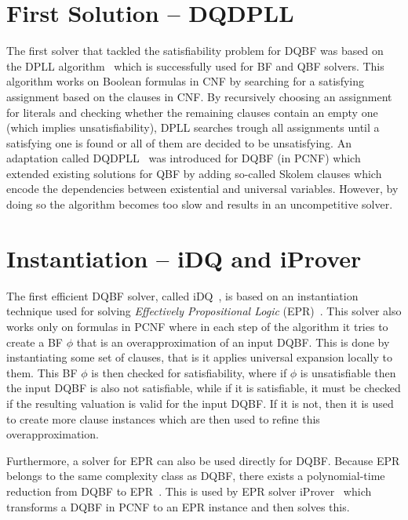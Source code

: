 \documentclass[
  digital, %
  color,
  twoside, %
  table,   %
  nolof,     %
  nolot,     %
]{fithesis3}
\theoremstyle{definition}
\theoremstyle{remark}
\begin{document}
\section{First Solution -- DQDPLL}
The first solver that tackled the satisfiability problem for DQBF was based on the DPLL algorithm~\cite{DPLL} which is successfully used for BF and QBF solvers. This algorithm works on Boolean formulas in CNF by searching for a satisfying assignment based on the clauses in CNF. By recursively choosing an assignment for literals and checking whether the remaining clauses contain an empty one (which implies unsatisfiability), DPLL searches trough all assignments until a satisfying one is found or all of them are decided to be unsatisfying. An adaptation called DQDPLL~\cite{DPLLalgorithm} was introduced for DQBF (in PCNF) which extended existing solutions for QBF by adding so-called Skolem clauses which encode the dependencies between existential and universal variables. However, by doing so the algorithm becomes too slow and results in an uncompetitive solver.

\section{Instantiation -- iDQ and iProver}
The first efficient DQBF solver, called iDQ~\cite{iDQandDQDIMACS}, is based on an instantiation technique used for solving \emph{Effectively Propositional Logic} (EPR)~\cite{iProver}. This solver also works only on formulas in PCNF where in each step of the algorithm it tries to create a BF $\phi$ that is an overapproximation of an input DQBF. This is done by instantiating some set of clauses, that is it applies universal expansion locally to them. This BF $\phi$ is then checked for satisfiability, where if $\phi$ is unsatisfiable then the input DQBF is also not satisfiable, while if it is satisfiable, it must be checked if the resulting valuation is valid for the input DQBF. If it is not, then it is used to create more clause instances which are then used to refine this overapproximation.

Furthermore, a solver for EPR can also be used directly for DQBF. Because EPR belongs to the same complexity class as DQBF, there exists a polynomial-time reduction from DQBF to EPR~\cite{iDQandDQDIMACS}. This is used by EPR solver iProver~\cite{iProver} which transforms a DQBF in PCNF to an EPR instance and then solves this.
\end{document}
